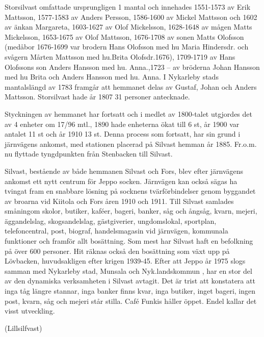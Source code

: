Storsilvast omfattade ursprungligen 1 mantal och innehades 1551-1573 av Erik Mattsson, 1577-1583 av Anders Persson, 1586-1600 av Mickel Mattsson och 1602 av änkan Margareta, 1603-1627 av Olof Mickelsson, 1628-1648 av mågen Matts Mickelsson, 1653-1675 av Olof Mattsson, 1676-1708 av sonen Matts Olofsson (medåbor 1676-1699 var brodern Hans Olofsson med hu Maria Hindersdr. och svågern Mårten Mattsson med hu.Brita Olofsdr.1676), 1709-1719 av Hans Olofssons son Anders Hansson med hu. Anna.,1723 – av bröderna Johan Hansson med hu Brita och Anders Hansson med hu. Anna.  I Nykarleby stads mantalslängd av 1783 framgår att hemmanet delas av Gustaf, Johan	och Anders	Mattsson.  Storsilvast hade år 1807  31 personer antecknade.

Styckningen av hemmanet har fortsatt och i medlet av 1800-talet utgjordes det av 4 enheter om 17/96 mtl., 1890 hade enheterna ökat till 6 st, år 1900 var antalet 11 st och år 1910  13 st. Denna process som fortsatt, har sin grund i järnvägens ankomst, med stationen placerad på Silvast hemman  år 1885. Fr.o.m. nu flyttade tyngdpunkten från Stenbacken till Silvast.

Silvast, bestående av både hemmanen Silvast och Fors, blev efter järnvägens ankomst ett nytt centrum för Jeppo socken. Järnvägen kan också sägas ha tvingat fram en snabbare lösning på socknens tvärförbindelser genom byggandet av broarna vid Kiitola och Fors åren 1910 och 1911. Till Silvast samlades småningom skolor, butiker, kaféer, bageri, banker, såg och ångsåg, kvarn, mejeri, äggandelslag, skogsandelslag, gästgiverier, ungdomslokal, sportplan, telefoncentral, post, biograf, handelsmagasin vid järnvägen, kommunala funktioner och framför allt bosättning. Som mest har Silvast haft en befolkning på över 600 personer. Hit räknas också den bosättning som växt upp på Lövbacken, huvudsakligen efter krigen 1939-45. Efter att Jeppo år 1975 slogs samman med Nykarleby stad, Munsala och Nyk.landskommun , har en stor del av den dynamiska verksamheten i  Silvast avtagit. Det är trist att konstatera att inga tåg längre stannar, inga banker finns kvar, inga butiker, inget bageri, ingen post, kvarn, såg och mejeri står stilla. Café Funkis håller öppet. Endel kallar det visst utveckling.


  (Lillsilfvast)

